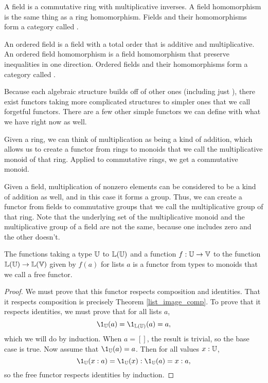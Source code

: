 \documentclass[../math.tex]{subfiles}
\begin{document}
\begin{definition}
    A field is a commutative ring with multiplicative inverses.  A field
    homomorphism is the same thing as a ring homomorphism.  Fields and their
    homomorphisms form a category called .
\end{definition}

\begin{definition}
    An ordered field is a field with a total order that is additive and
    multiplicative.  An ordered field homomorphism is a field homomorphism that
    preserve inequalities in one direction.  Ordered fields and their
    homomorphisms form a category called .
\end{definition}

Because each algebraic structure builds off of other ones (including just
\Type), there exist functors taking more complicated structures to simpler ones
that we call forgetful functors.  There are a few other simple functors we can
define with what we have right now as well.

\begin{definition}
    Given a ring, we can think of multiplication as being a kind of addition,
    which allows us to create a functor from rings to monoids that we call the
    multiplicative monoid of that ring.  Applied to commutative rings, we get a
    commutative monoid.
\end{definition}

\begin{definition}
    Given a field, multiplication of nonzero elements can be considered to be a
    kind of addition as well, and in this case it forms a group.  Thus, we can
    create a functor from fields to commutative groups that we call the
    multiplicative group of that ring.  Note that the underlying set of the
    multiplicative monoid and the multiplicative group of a field are not the
    same, because one includes zero and the other doesn't.
\end{definition}

\begin{theorem}
    The functions taking a type $\mathbb{U}$ to $\mathbb{L}(\mathbb{U})$ and a function $f : \mathbb{U} \to \mathbb{V}$
    to the function $\mathbb{L}(\mathbb{U}) \to \mathbb{L}(\mathbb{V})$ given by $f(a)$ for lists $a$ is a
    functor from types to monoids that we call a free functor.
\end{theorem}
\begin{proof}
    We must prove that this functor respects composition and identities.  That
    it respects composition is precisely Theorem \ref{list_image_comp}.  To
    prove that it respects identities, we must prove that for all lists $a$,
    \[
        \1_{\U}(a) = \1_{\L(\U)}(a) = a,
    \]
    which we will do by induction.  When $a = []$, the result is trivial, so the
    base case is true.  Now assume that $\1_{\U}(a) = a$.  Then for all values
    $x : \mathbb{U}$,
    \[
        \1_{\U}(x : a) = \1_{\U}(x) : \1_{\U}(a) = x : a,
    \]
    so the free functor respects identities by induction.
\end{proof}
\end{document}
